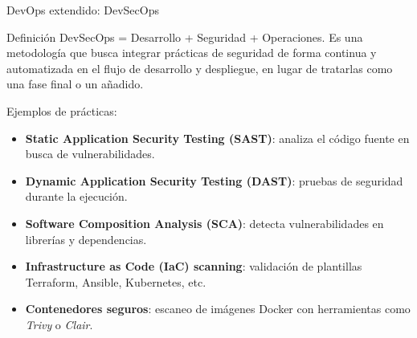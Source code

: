 \documentclass{beamer}
\begin{document}

\begin{frame}{DevOps extendido: DevSecOps}

\begin{block}{Definición}
DevSecOps = Desarrollo + Seguridad + Operaciones. Es una metodología que busca integrar prácticas de seguridad de forma continua y automatizada en el flujo de desarrollo y despliegue, en lugar de tratarlas como una fase final o un añadido.
\end{block}

Ejemplos de prácticas:

\begin{itemize}
    \item \textbf{Static Application Security Testing (SAST)}: analiza el código fuente en busca de vulnerabilidades.
    \item \textbf{Dynamic Application Security Testing (DAST)}: pruebas de seguridad durante la ejecución.
    \item \textbf{Software Composition Analysis (SCA)}: detecta vulnerabilidades en librerías y dependencias.
    \item \textbf{Infrastructure as Code (IaC) scanning}: validación de plantillas Terraform, Ansible, Kubernetes, etc.
    \item \textbf{Contenedores seguros}: escaneo de imágenes Docker con herramientas como \textit{Trivy} o \textit{Clair}.
\end{itemize}

    
\end{frame}
\end{document}
